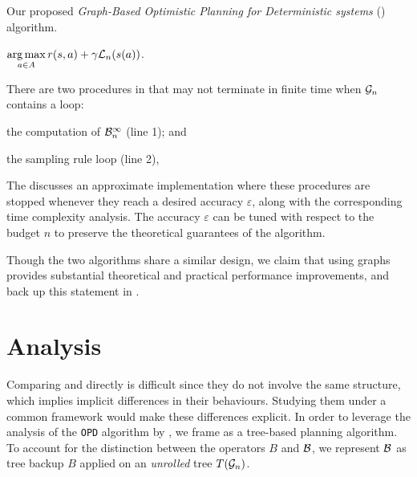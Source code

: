 \documentclass[runningheads]{llncs}
\begin{document}
\begin{algorithm}[th]
	\caption{Our proposed \emph{Graph-Based Optimistic Planning for Deterministic systems} (\GBOPD) algorithm.}
	\label{alg:gbop-d}
	\DontPrintSemicolon
	\Return $\displaystyle\operatorname*{arg\,max}_{a\in A} r(s,a) + \gamma \mathcal{L}_n(s(a))$. 
\end{algorithm}

\begin{remark}[Termination]
There are two procedures in \GBOPD that may not terminate in finite time when $\mathcal{G}_n$ contains a loop:
\begin{enumerate*}[label=(\roman*)]
	\item the computation of $\mathcal{B}_n^\infty$ (line 1); and
	\item the sampling rule loop (line 2),
\end{enumerate*}
The  discusses an approximate implementation where these procedures are stopped whenever they reach a desired accuracy $\varepsilon$, along with the corresponding time complexity analysis. The accuracy $\varepsilon$ can be tuned with respect to the budget $n$ to preserve the theoretical guarantees of the algorithm.
\end{remark}

Though the two algorithms share a similar design, we claim that using graphs provides substantial theoretical and practical performance improvements, and back up this statement in .

\section{Analysis}
\label{sec:analysis}

Comparing \OPD and \GBOPD directly is difficult since they do not involve the same structure, which implies implicit differences in their behaviours. Studying them under a common framework would make these differences explicit. In order to leverage the analysis of the \texttt{OPD} algorithm by \citet{Hren2008optimistic}, we frame \GBOPD as a tree-based planning algorithm. To account for the distinction between the operators $B$ and $\mathcal{B}$, we represent $\mathcal{B}$ as tree backup $B$ applied on an \emph{unrolled} tree $T(\mathcal{G}_n)$.
\end{document}
